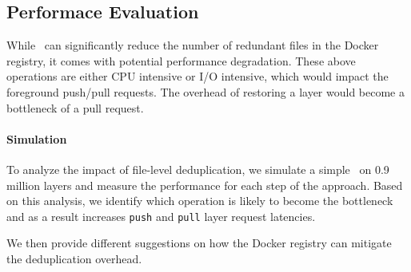 \subsection{Performace Evaluation}


While \sysname\ can significantly reduce the number of redundant files in the
Docker registry, it comes with potential performance degradation.
%
These above
operations are either CPU intensive or I/O intensive, which would impact the
foreground push/pull requests.  The overhead of restoring a layer would become
a bottleneck of a pull request.


\paragraph{Simulation}
%
To analyze the impact of file-level deduplication, we simulate a simple \sysname\ on
0.9 million layers and measure the performance for each step of the approach.
%
Based on this analysis, we identify which operation is likely to become the bottleneck
and as a result increases \texttt{push} and \texttt{pull} layer request latencies.

We then provide different suggestions on how the Docker registry can mitigate
the deduplication overhead.





%
%
%


